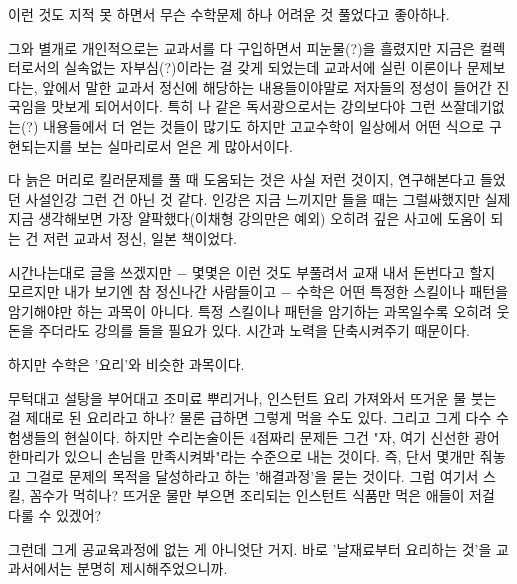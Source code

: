 이런 것도 지적 못 하면서 무슨 수학문제 하나 어려운 것 풀었다고 좋아하나.
\vspace{5mm}

그와 별개로 개인적으로는 교과서를 다 구입하면서 피눈물(?)을 흘렸지만 지금은 컬렉터로서의 실속없는 자부심(?)이라는 걸 갖게 되었는데
교과서에 실린 이론이나 문제보다는, 앞에서 말한 교과서 정신에 해당하는 내용들이야말로 저자들의 정성이 들어간 진국임을 맛보게 되어서이다.
특히 나 같은 독서광으로서는 강의보다야 그런 쓰잘데기없는(?) 내용들에서 더 얻는 것들이 많기도 하지만
고교수학이 일상에서 어떤 식으로 구현되는지를 보는 실마리로서 얻은 게 많아서이다.
\vspace{5mm}

다 늙은 머리로 킬러문제를 풀 때 도움되는 것은 사실 저런 것이지, 연구해본다고 들었던 사설인강 그런 건 아닌 것 같다.
인강은 지금 느끼지만 들을 때는 그럴싸했지만 실제 지금 생각해보면 가장 얄팍했다(이채형 강의만은 예외)
오히려 깊은 사고에 도움이 되는 건 저런 교과서 정신, 일본 책이었다.
\vspace{5mm}

시간나는대로 글을 쓰겠지만 $-$ 몇몇은 이런 것도 부풀려서 교재 내서 돈번다고 할지 모르지만 내가 보기엔 참 정신나간 사람들이고 $-$
수학은 어떤 특정한 스킬이나 패턴을 암기해야만 하는 과목이 아니다.
특정 스킬이나 패턴을 암기하는 과목일수록 오히려 웃돈을 주더라도 강의를 들을 필요가 있다. 시간과 노력을 단축시켜주기 때문이다.
\vspace{5mm}

하지만 수학은 '요리'와 비슷한 과목이다.
\vspace{5mm}

무턱대고 설탕을 부어대고 조미료 뿌리거나, 인스턴트 요리 가져와서 뜨거운 물 붓는 걸 제대로 된 요리라고 하나?
물론 급하면 그렇게 먹을 수도 있다. 그리고 그게 다수 수험생들의 현실이다.
하지만 수리논술이든 4점짜리 문제든 그건 "자, 여기 신선한 광어 한마리가 있으니 손님을 만족시켜봐"라는 수준으로 내는 것이다.
즉, 단서 몇개만 줘놓고 그걸로 문제의 목적을 달성하라고 하는 '해결과정'을 묻는 것이다.
그럼 여기서 스킬, 꼼수가 먹히나? 뜨거운 물만 부으면 조리되는 인스턴트 식품만 먹은 애들이 저걸 다룰 수 있겠어?
\vspace{5mm}

그런데 그게 공교육과정에 없는 게 아니엇단 거지. 바로 '날재료부터 요리하는 것'을 교과서에서는 분명히 제시해주었으니까.
\vspace{5mm}

